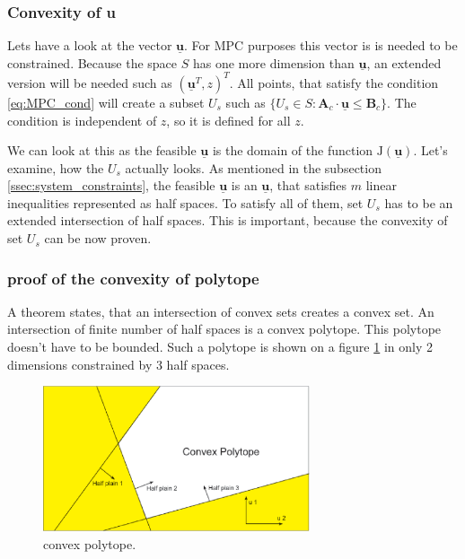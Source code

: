 \documentclass{article}
\begin{document}
\subsubsection{Convexity of u}
Lets have a look at the vector $\underline{\textbf{u}}$. For MPC purposes this vector is is needed to be constrained. Because the space $S$ has one more dimension than $\underline{\textbf{u}}$, an extended version will be needed such as $(\underline{\textbf{u}}^T, z)^T$.
All points, that satisfy the condition \ref{eq:MPC_cond} will create a subset $U_s$ such as $\{U_s \in S : \textbf{A}_c \cdot \underline{\textbf{u}} \leq \textbf{B}_c\}$. The condition is independent of $z$, so it is defined for all $z$. 

We can look at this as the feasible $\underline{\textbf{u}}$ is the domain of the function $\mathrm{J}(\underline{\textbf{u}})$. Let's examine, how the $U_s$ actually looks. As mentioned in the subsection \ref{ssec:system_constraints}, the feasible $\underline{\textbf{u}}$ is an $\underline{\textbf{u}}$, that satisfies $m$ linear inequalities represented as half spaces. To satisfy all of them, set $U_s$ has to be an extended intersection of half spaces. This is important, because the convexity of set $U_s$ can be now proven. 

\subsubsection{proof of the convexity of polytope}

A theorem states, that an intersection of convex sets creates a convex set. An intersection of finite number of half spaces is a convex polytope. This polytope doesn't have to be bounded. Such a polytope is shown on a figure \ref{fig:convex_polytope} in only 2 dimensions constrained by 3 half spaces.

\begin{figure}[h]
\includegraphics[width=0.7\textwidth]{fig/convex_polytope.eps} 
\caption{convex polytope.}
\label{fig:convex_polytope}
\end{figure}
\end{document}
